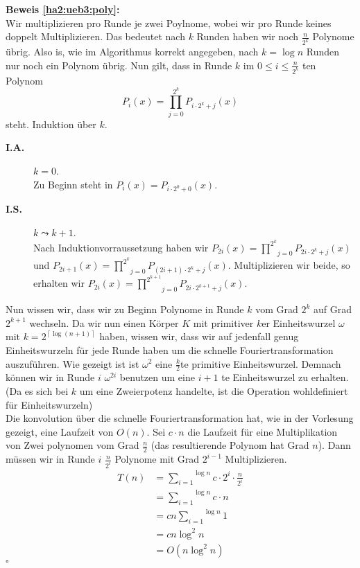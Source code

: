 \documentclass[11pt,a4paper,ngerman]{article}
\begin{document}
\textbf{Beweis \ref{ha2:ueb3:poly}:}\\

Wir multiplizieren pro Runde je zwei Poylnome, wobei wir pro Runde keines doppelt Multiplizieren. Das bedeutet nach $k$ Runden
haben wir noch $\frac{n}{2^k}$ Polynome übrig. Also is, wie im Algorithmus korrekt angegeben, nach $k=\log n$ Runden nur noch
ein Polynom übrig. Nun gilt, dass in Runde $k$ im $0 \leq i \leq \frac{n}{2^k}$ ten Polynom 
\begin{equation*}
    P_i(x) = \underset{j=0}{\overset{2^k}{\prod}} P_{i\cdot 2^k+j}(x)
\end{equation*}
steht.
Induktion über $k$.
\begin{description}
    \item[\bfseries I.A.] $k = 0$.\\
        Zu Beginn steht in $P_i(x) = P_{i\cdot 2^0 + 0}(x)$.
    \item[\bfseries I.S.] $k \leadsto k+1$.\\
        Nach Induktionvorraussetzung 
        haben wir $P_{2i}(x) = \underset{j=0}{\overset{2^k}{\prod}} P_{2i\cdot 2^k + j}(x)$ und
        $P_{2i+1}(x) = \underset{j=0}{\overset{2^k}{\prod}} P_{(2i+1)\cdot 2^k + j}(x)$.
        Multiplizieren wir beide, so erhalten wir
        $P_{2i}(x) = \underset{j=0}{\overset{2^{k+1}}{\prod}} P_{2i\cdot 2^{k+1} + j}(x)$.
\end{description}

Nun wissen wir, dass wir zu Beginn Polynome in Runde $k$ vom Grad $2^k$ auf Grad $2^{k+1}$ wechseln. Da wir nun einen Körper $K$
mit primitiver $k$er Einheitswurzel $\omega$ mit $k=2^{\left\lceil \log (n+1)\right\rceil}$ haben, wissen wir, dass wir auf jedenfall genug
Einheitswurzeln für jede Runde haben um die schnelle Fouriertransformation auszuführen.
Wie gezeigt ist ist $\omega^2$ eine $\frac{k}{2}$te primitive Einheitswurzel. Demnach können wir in Runde $i$ $\omega^{2i}$ benutzen um eine $i+1$ te Einheitswurzel
zu erhalten. (Da es sich bei $k$ um eine Zweierpotenz handelte, ist die Operation wohldefiniert für Einheitswurzeln)\\

Die konvolution über die schnelle Fouriertransformation hat, wie in der Vorlesung gezeigt, eine Laufzeit von $O(n)$. Sei $c\cdot n$ die Laufzeit für eine Multiplikation
von Zwei polynomen vom Grad $\frac{n}{2}$ (das resultierende Polynom hat Grad $n$).
Dann müssen wir in Runde $i$ $\frac{n}{2^i}$ Polynome mit Grad $2^{i-1}$ Multiplizieren.
\begin{equation*}\begin{split}
    T(n) &= \overset{\log n}{\underset{i=1}{\sum}} c \cdot 2^i \cdot \frac{n}{2^i}\\
        &= \overset{\log n}{\underset{i=1}{\sum}} c \cdot n\\
        &= cn \overset{\log n}{\underset{i=1}{\sum}} 1\\
        &= cn \log^2 n\\
        &= O(n \log^2 n)
\end{split}\end{equation*}
\mbox{}\hfill $\square$
\end{document}
